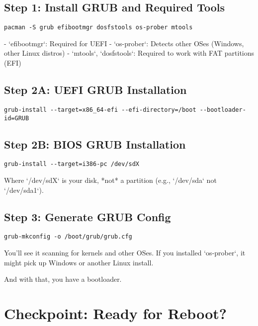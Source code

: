 \documentclass[12pt,openany]{book}
\begin{document}
\subsection*{Step 1: Install GRUB and Required Tools}

\begin{lstlisting}
pacman -S grub efibootmgr dosfstools os-prober mtools
\end{lstlisting}

- `efibootmgr`: Required for UEFI
- `os-prober`: Detects other OSes (Windows, other Linux distros)
- `mtools`, `dosfstools`: Required to work with FAT partitions (EFI)

\subsection*{Step 2A: UEFI GRUB Installation}

\begin{lstlisting}
grub-install --target=x86_64-efi --efi-directory=/boot --bootloader-id=GRUB
\end{lstlisting}

\subsection*{Step 2B: BIOS GRUB Installation}

\begin{lstlisting}
grub-install --target=i386-pc /dev/sdX
\end{lstlisting}

Where `/dev/sdX` is your disk, *not* a partition (e.g., `/dev/sda` not `/dev/sda1`).

\subsection*{Step 3: Generate GRUB Config}

\begin{lstlisting}
grub-mkconfig -o /boot/grub/grub.cfg
\end{lstlisting}

You’ll see it scanning for kernels and other OSes. If you installed `os-prober`, it might pick up Windows or another Linux install.

And with that, you have a bootloader.

\section{Checkpoint: Ready for Reboot?}
\end{document}
